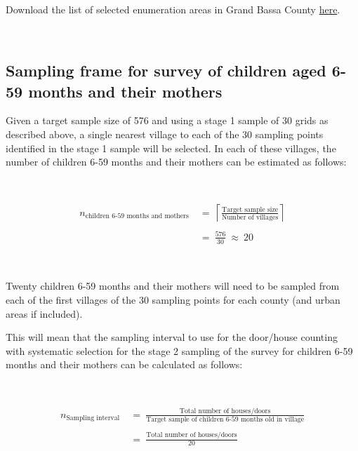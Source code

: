 \documentclass[12pt,a4paper]{book}
\theoremstyle{definition}
\theoremstyle{definition}
\theoremstyle{definition}
\theoremstyle{remark}
\let\BeginKnitrBlock\begin \let\EndKnitrBlock\end
\begin{document}
~

\BeginKnitrBlock{rmddownload}
Download the list of selected enumeration areas in Grand Bassa County
\href{data/grandBassaSPlist.csv}{here}.
\EndKnitrBlock{rmddownload}

~

\hypertarget{sampling-frame-for-survey-of-children-aged-6-59-months-and-their-mothers}{%
\subsection{Sampling frame for survey of children aged 6-59 months and
their
mothers}\label{sampling-frame-for-survey-of-children-aged-6-59-months-and-their-mothers}}

Given a target sample size of 576 and using a stage 1 sample of 30 grids
as described above, a single nearest village to each of the 30 sampling
points identified in the stage 1 sample will be selected. In each of
these villages, the number of children 6-59 months and their mothers can
be estimated as follows:

~

\[\begin{aligned} 
n_{\text{children 6-59 months and mothers}} & ~ = ~ \left \lceil \frac{\text{Target sample size}}{\text{Number of villages}} \right \rceil \\
\\
& ~ = ~ \frac{576}{30} ~ \approx ~ 20
\end{aligned}\]

~

Twenty children 6-59 months and their mothers will need to be sampled
from each of the first villages of the 30 sampling points for each
county (and urban areas if included).

This will mean that the sampling interval to use for the door/house
counting with systematic selection for the stage 2 sampling of the
survey for children 6-59 months and their mothers can be calculated as
follows:

~

\[\begin{aligned}
n_{\text{Sampling interval}} & ~ = ~ \frac{\text{Total number of houses/doors}}{\text{Target sample of children 6-59 months old in village}} \\
\\
& ~ = ~ \frac{\text{Total number of houses/doors}}{\text{20}}
\end{aligned}\]

~
\end{document}
